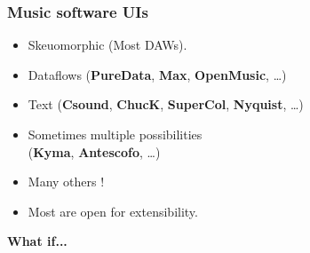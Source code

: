 \documentclass{beamer}
\begin{document}
\begin{frame}
	\frametitle{Music software UIs}    
	\Large
	\begin{itemize}
        \item<1-> Skeuomorphic (Most DAWs).
		\item<2-> Dataflows (\textbf{PureData}, \textbf{Max}, \textbf{OpenMusic}, \dots)
		\item<3-> Text (\textbf{Csound}, \textbf{ChucK}, \textbf{SuperCol}, \textbf{Nyquist}, \dots)
		\item<4-> Sometimes multiple possibilities~\\ (\textbf{Kyma}, \textbf{Antescofo}, \dots)
        \item<5-> Many others !
        \item<6-> Most are open for extensibility.
	\end{itemize}
\end{frame}

\begin{frame}
	\Huge
    \centering
    \textbf{What if...}
\end{frame}

\begin{frame}[plain]
\end{frame}
\end{document}
